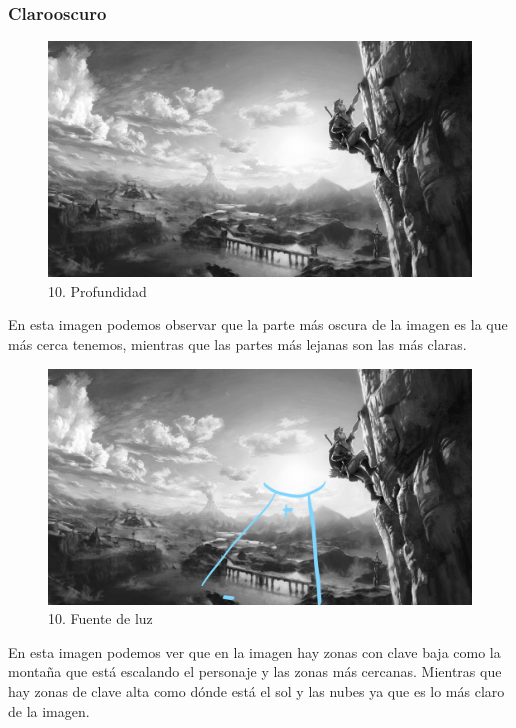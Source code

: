 \documentclass[12pt]{article}
\begin{document}
        \subsubsection{Clarooscuro}
        \begin{figure}[H]
          \centering
          \includegraphics[scale=0.35]{images/Selena/10_concept_art grises.jpg}
          \caption{\small 10. Profundidad}
        \end{figure}
        En esta imagen podemos observar que la parte más oscura de la imagen es la que más cerca tenemos, mientras que las partes más lejanas son las más claras.
        \begin{figure}[H]
          \centering
          \includegraphics[scale=0.35]{images/Selena/Inked10_concept_art grises lineas.jpg}
          \caption{\small 10. Fuente de luz}
        \end{figure}
        En esta imagen podemos ver que en la imagen hay zonas con clave baja  como la montaña que está escalando el personaje y las zonas más cercanas. Mientras que hay zonas de clave alta como dónde está el sol y las nubes ya que es lo más claro de la imagen.
        
\end{document}
